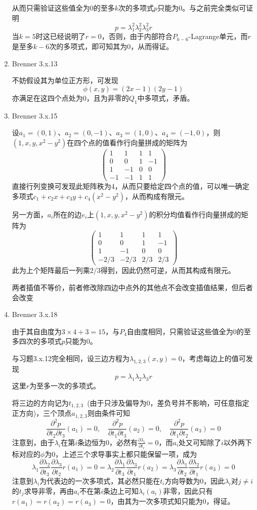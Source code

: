 \documentclass[a4paper,UTF8,fontset=windows,10pt]{ctexart}
\begin{document}
\begin{enumerate}
    从而只需验证这些值全为0的至多$k$次的多项式$p$只能为0。与之前完全类似可证明
    $$p=\lambda_1^2\lambda_2^2\lambda_3^2r$$
    当$k=5$时这已经说明了$r=0$，否则，由于内部符合$P_{k-6}$-Lagrange单元，而$r$是至多$k-6$次的多项式，即可知其为0，从而得证。
    
    \item Brenner 3.x.13
    
    不妨假设其为单位正方形，可发现
    $$\phi(x,y)=(2x-1)(2y-1)$$
    亦满足在这四个点处为0，且为非零的$Q_1$中多项式，矛盾。
    
    \item Brenner 3.x.15
    
    设$a_1=(0,1)$、$a_2=(0,-1)$、$a_3=(1,0)$、$a_4=(-1,0)$，则$(1,x,y,x^2-y^2)$在四个点的值看作行向量拼成的矩阵为
    $$\begin{pmatrix}1&1&1&1\\0&0&1&-1\\1&-1&0&0\\-1&-1&1&1\end{pmatrix}$$
    直接行列变换可发现此矩阵秩为4，从而只要给定四个点的值，可以唯一确定多项式$c_1+c_2x+c_3y+c_4(x^2-y^2)$，从而构成有限元。
    
    另一方面，$a_i$所在的边$e_i$上$(1,x,y,x^2-y^2)$的积分均值看作行向量拼成的矩阵为
    $$\begin{pmatrix}1&1&1&1\\0&0&1&-1\\1&-1&0&0\\-2/3&-2/3&2/3&2/3\end{pmatrix}$$
    此为上个矩阵最后一列乘$2/3$得到，因此仍然可逆，从而其构成有限元。
    
    两者插值不等价，前者修改除四边中点外的其他点不会改变插值结果，但后者会改变
    
    \item Brenner 3.x.18
    
    由于其自由度为$3\times 4+3=15$，与$P_4$自由度相同，只需验证这些值全为0的至多四次的多项式$p$只能为0。
    
    与习题3.x.12完全相同，设三边方程为$\lambda_{1,2,3}(x,y)=0$，考虑每边上的值可发现
    $$p=\lambda_1\lambda_2\lambda_3r$$
    这里$r$为至多一次的多项式。
    
    将三边的方向记为$t_{1,2,3}$\ (由于只涉及偏导为0，差负号并不影响，可任意指定正方向)，三个顶点$a_{1,2,3}$则由条件可知
    $$\frac{\partial^2p}{\partial t_2\partial t_3}(a_1)=0,\quad\frac{\partial^2p}{\partial t_1\partial t_3}(a_2)=0,\quad\frac{\partial^2p}{\partial t_1\partial t_2}(a_3)=0$$
    注意到，由于$\lambda_i$在第$i$条边恒为0，必然有$\frac{\partial\lambda_i}{\partial t_i}=0$，而$a_i$处又可知除了$i$以外两下标对应的$\phi$为0，上述三个求导事实上都只能保留一项，成为
    $$\lambda_1\frac{\partial\lambda_2}{\partial t_3}\frac{\partial\lambda_3}{\partial t_2}r(a_1)=0=\lambda_2\frac{\partial\lambda_1}{\partial t_3}\frac{\partial\lambda_3}{\partial t_1}r(a_2)=\lambda_3\frac{\partial\lambda_1}{\partial t_2}\frac{\partial\lambda_2}{\partial t_1}r(a_3)=0$$
    注意到$\lambda_i$为代表边的一次多项式，其必然只能在$t_i$方向导数为0，因此$\lambda_i$对$j\ne i$的$t_j$求导非零，再由$a_i$不在第$i$条边上可知$\lambda_i(a_i)$非零，因此只有$r(a_1)=r(a_2)=r(a_3)=0$，由其为一次多项式知只能为0，得证。
    

\end{enumerate}
\end{document}
